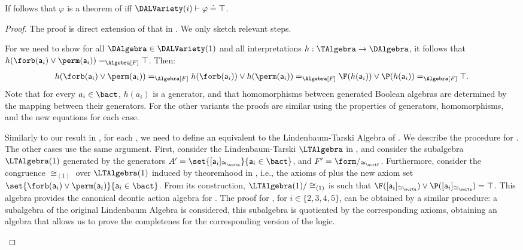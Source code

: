 \begin{theorem}\label{theorem:completeness:dal:i}
	If follows that $\varphi$ is a theorem of  iff $\DALVariety(i) \vdash \varphi \doteq \top$.
\end{theorem}
\begin{proof} The proof is direct extension of that in . We only sketch relevant steps.

\medskip 

\begin{description}
	\setlength{\itemsep}{5pt}
	\item[Soundness.]
	For  we need to show for all $\DAlgebra \in \DALVariety(1)$ and all interpretations $h: \TAlgebra \to \DAlgebra$, it follows that $h({\forb(\mathsf{a}_i) \lor \perm(\mathsf{a}_i)}) =_{\Algebra[F]} \top$.
	Then:
		\begin{align*}
			h({\forb(\mathsf{a}_i) \lor \perm(\mathsf{a}_i)}) =_{\Algebra[F]}
			h(\forb(\mathsf{a}_i)) \lor h(\perm(\mathsf{a}_i)) =_{\Algebra[F]}
			\F(h(\mathsf{a}_i)) \lor \P(h(\mathsf{a}_i)) =_{\Algebra[F]}
			\top.
		\end{align*}%
	Note that for every $a_i \in \bact$, $h(a_i)$ is a generator, and that homomorphisms between generated Boolean algebras are determined by the mapping between their generators. 
	For the other variants the proofs are similar using the properties of generators, homomorphisms, and the new equations for each case.

	\item[Completeness.]
	Similarly to our result in , for each , we need to define an equivalent to the Lindenbaum-Tarski Algebra of \DAL.  We describe the procedure for .
	The other cases use the same argument. 
	First, consider the Lindenbaum-Tarski $\LTAlgebra$ in , and  consider the subalgebra $\LTAlgebra(1)$ generated by the generators 
	$A' =\set{[\mathsf{a}_i]_{\cong_{\sorta}}}{\mathsf{a}_i \in \bact}$, and $F' = \form/_{\cong_{\sortf}}$.
	Furthermore, consider the congruence $\cong_{(1)}$ over $\LTAlgebra(1)$ induced by theoremhood in , i.e., the axioms of \DAL plus the new axiom set $\set{\forb(\mathsf{a}_i) \lor \perm(\mathsf{a}_i)}{\mathsf{a}_i \in \bact}$.
	From its construction, $\LTAlgebra(1)/\cong_{(1)}$ is such that	$\F([\mathsf{a}_i]_{\cong_{\sorta}}) \lor \P([\mathsf{a}_i]_{\cong_{\sorta}}) = \top$.
	This algebra provides the canonical deontic action algebra for .
	The proof for , for $i \in \{2,3,4,5\}$, can be obtained by a similar procedure: a subalgebra of the original Lindenbaum Algebra is considered,  this subalgebra is quotiented by the corresponding axioms, obtaining an algebra that allows us to prove the completenes for the corresponding version of the logic.
	\qedhere
\end{description}
\end{proof}

